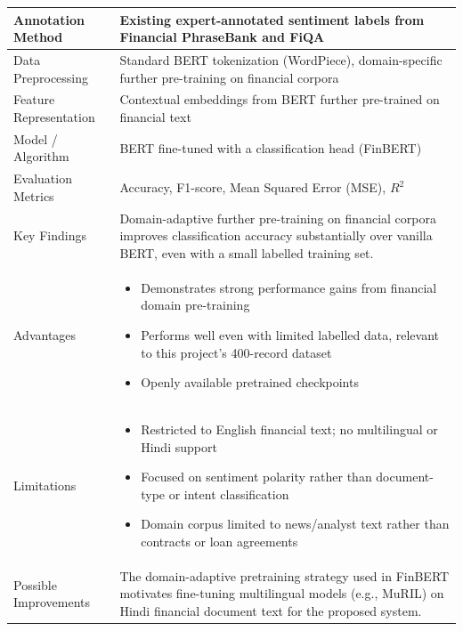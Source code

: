 \begin{longtable}{|p{5cm}|p{10cm}|}
Annotation Method &
Existing expert-annotated sentiment labels from Financial PhraseBank and FiQA
\\ \hline

Data Preprocessing &
Standard BERT tokenization (WordPiece), domain-specific further pre-training on financial corpora
\\ \hline

Feature Representation &
Contextual embeddings from BERT further pre-trained on financial text
\\ \hline

Model / Algorithm &
BERT fine-tuned with a classification head (FinBERT)
\\ \hline

Evaluation Metrics &
Accuracy, F1-score, Mean Squared Error (MSE), $R^2$
\\ \hline

Key Findings &
Domain-adaptive further pre-training on financial corpora improves classification accuracy substantially over vanilla BERT, even with a small labelled training set.
\\ \hline

Advantages &
\begin{itemize}
\item Demonstrates strong performance gains from financial domain pre-training
\item Performs well even with limited labelled data, relevant to this project's 400-record dataset
\item Openly available pretrained checkpoints
\end{itemize}
\\ \hline

Limitations &
\begin{itemize}
\item Restricted to English financial text; no multilingual or Hindi support
\item Focused on sentiment polarity rather than document-type or intent classification
\item Domain corpus limited to news/analyst text rather than contracts or loan agreements
\end{itemize}
\\ \hline

Possible Improvements &
The domain-adaptive pretraining strategy used in FinBERT motivates fine-tuning multilingual models (e.g., MuRIL) on Hindi financial document text for the proposed system.
\\ \hline

\end{longtable}

